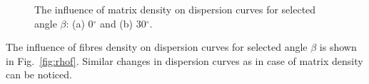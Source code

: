 \documentclass[preprint,12pt]{elsarticle}
\begin{document}
\begin{figure} [h!]
 	\caption{The influence of matrix density on dispersion curves for selected angle $\beta$: (a) 0$^{\circ}$ and (b) 30$^{\circ}$.} 
 	\label{fig:rhom}
 \end{figure}
\clearpage

The influence of fibres density on dispersion curves for selected angle $\beta$ is shown in Fig.~\ref{fig:rhof}. Similar changes in dispersion curves as in case of matrix density can be noticed.
\end{document}
